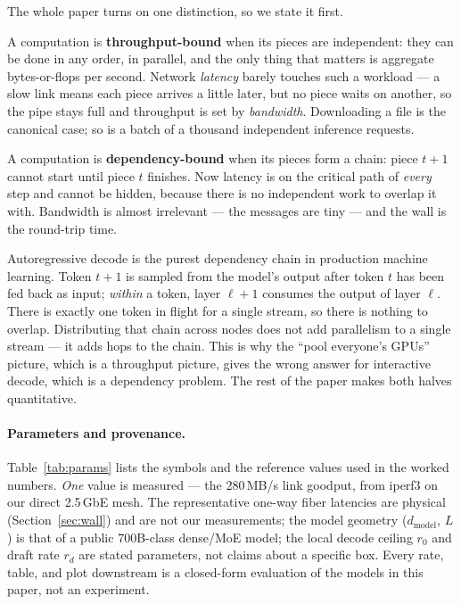 \documentclass[11pt]{article}
\newcommand{\dmodel}{\ensuremath{d_{\mathrm{model}}}}
\begin{document}
The whole paper turns on one distinction, so we state it first.

A computation is \textbf{throughput-bound} when its pieces are independent: they can be done in any
order, in parallel, and the only thing that matters is aggregate bytes-or-flops per second. Network
\emph{latency} barely touches such a workload --- a slow link means each piece arrives a little
later, but no piece waits on another, so the pipe stays full and throughput is set by
\emph{bandwidth}. Downloading a file is the canonical case; so is a batch of a thousand independent
inference requests.

A computation is \textbf{dependency-bound} when its pieces form a chain: piece $t+1$ cannot start
until piece $t$ finishes. Now latency is on the critical path of \emph{every} step and cannot be
hidden, because there is no independent work to overlap it with. Bandwidth is almost irrelevant ---
the messages are tiny --- and the wall is the round-trip time.

Autoregressive decode is the purest dependency chain in production machine learning. Token $t+1$ is
sampled from the model's output after token $t$ has been fed back as input; \emph{within} a token,
layer $\ell+1$ consumes the output of layer $\ell$. There is exactly one token in flight for a
single stream, so there is nothing to overlap. Distributing that chain across nodes does not add
parallelism to a single stream --- it adds hops to the chain. This is why the ``pool everyone's
GPUs'' picture, which is a throughput picture, gives the wrong answer for interactive decode, which
is a dependency problem. The rest of the paper makes both halves quantitative.

\paragraph{Parameters and provenance.}
Table~\ref{tab:params} lists the symbols and the reference values used in the worked numbers.
\emph{One} value is measured --- the 280\,MB/s link goodput, from iperf3 on our direct 2.5\,GbE
mesh. The representative one-way fiber latencies are physical (Section~\ref{sec:wall}) and are not
our measurements; the model geometry (\dmodel, $L$) is that of a public 700B-class dense/MoE model;
the local decode ceiling $r_0$ and draft rate $r_d$ are stated parameters, not claims about a
specific box. Every rate, table, and plot downstream is a closed-form evaluation of the models in
this paper, not an experiment.
\end{document}
